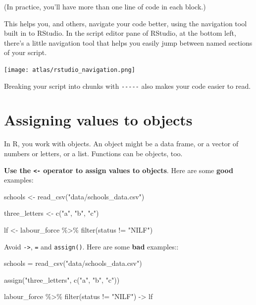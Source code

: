 \documentclass[
]{book}
\newenvironment{Shaded}{\begin{snugshade}}{\end{snugshade}}
\newcommand{\FunctionTok}[1]{\textcolor[rgb]{0.00,0.00,0.00}{#1}}
\newcommand{\NormalTok}[1]{#1}
\newcommand{\OtherTok}[1]{\textcolor[rgb]{0.56,0.35,0.01}{#1}}
\newcommand{\SpecialCharTok}[1]{\textcolor[rgb]{0.00,0.00,0.00}{#1}}
\newcommand{\StringTok}[1]{\textcolor[rgb]{0.31,0.60,0.02}{#1}}
\begin{document}
(In practice, you'll have more than one line of code in each block.)

This helps you, and others, navigate your code better, using the navigation tool built in to RStudio. In the script editor pane of RStudio, at the bottom left, there's a little navigation tool that helps you easily jump between named sections of your script.

\texttt{[image: atlas/rstudio\_navigation.png]}

Breaking your script into chunks with \texttt{-\/-\/-\/-\/-} also makes your code easier to read.

\hypertarget{assigning-values-to-objects}{%
\section{Assigning values to objects}\label{assigning-values-to-objects}}

In R, you work with objects. An object might be a data frame, or a vector of numbers or letters, or a list. Functions can be objects, too.

\textbf{Use the \texttt{\textless{}-} operator to assign values to objects}. Here are some \textbf{good} examples:

\begin{Shaded}
\begin{Highlighting}[]
\NormalTok{schools }\OtherTok{\textless{}{-}} \FunctionTok{read\_csv}\NormalTok{(}\StringTok{"data/schools\_data.csv"}\NormalTok{)}

\NormalTok{three\_letters }\OtherTok{\textless{}{-}} \FunctionTok{c}\NormalTok{(}\StringTok{"a"}\NormalTok{, }\StringTok{"b"}\NormalTok{, }\StringTok{"c"}\NormalTok{)}

\NormalTok{lf }\OtherTok{\textless{}{-}}\NormalTok{ labour\_force }\SpecialCharTok{\%\textgreater{}\%}
  \FunctionTok{filter}\NormalTok{(status }\SpecialCharTok{!=} \StringTok{"NILF"}\NormalTok{)}
\end{Highlighting}
\end{Shaded}

Avoid \texttt{-\textgreater{}}, \texttt{=} and \texttt{assign()}. Here are some \textbf{bad} examples::

\begin{Shaded}
\begin{Highlighting}[]
\NormalTok{schools }\OtherTok{=} \FunctionTok{read\_csv}\NormalTok{(}\StringTok{"data/schools\_data.csv"}\NormalTok{)}

\FunctionTok{assign}\NormalTok{(}\StringTok{"three\_letters"}\NormalTok{, }\FunctionTok{c}\NormalTok{(}\StringTok{"a"}\NormalTok{, }\StringTok{"b"}\NormalTok{, }\StringTok{"c"}\NormalTok{))}

\NormalTok{labour\_force }\SpecialCharTok{\%\textgreater{}\%}
  \FunctionTok{filter}\NormalTok{(status }\SpecialCharTok{!=} \StringTok{"NILF"}\NormalTok{) }\OtherTok{{-}\textgreater{}}\NormalTok{ lf}
\end{Highlighting}
\end{Shaded}
\end{document}
